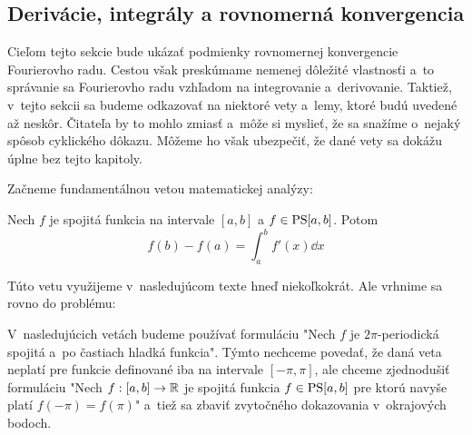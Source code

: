 \subsection{Derivácie, integrály a rovnomerná konvergencia}

Cieľom tejto sekcie bude ukázať podmienky rovnomernej konvergencie
Fourierovho radu. Cestou však preskúmame nemenej dôležité vlastnosťi
a~to správanie sa Fourierovho radu vzhľadom na integrovanie 
a~derivovanie. Taktiež, v~tejto sekcii sa budeme odkazovať na niektoré
vety a~lemy, ktoré budú uvedené až neskôr. Čitateľa by to mohlo zmiasť
a~môže si myslieť, že sa snažíme o~nejaký spôsob cyklického dôkazu.
Môžeme ho však ubezpečiť, že dané vety sa dokážu úplne bez tejto
kapitoly.

Začneme fundamentálnou vetou matematickej analýzy:
\begin{veta}
    Nech $f$ je spojitá funkcia na intervale $[a,b]$ a $f\in\mbox{PS}[a,b]$.
    Potom
    \begin{equation*}
        f(b) - f(a) = \int_a^b f'(x) \dd x
    \end{equation*}
\end{veta}
Túto vetu využijeme v~nasledujúcom texte hneď niekoľkokrát.
Ale vrhnime sa rovno do problému:

\begin{poznamka}
    V~nasledujúcich vetách budeme používať formuláciu "Nech $f$ je 
    $2\pi$-periodická spojitá a~po častiach hladká funkcia". Týmto
    nechceme povedať, že daná veta neplatí pre funkcie definované iba
    na intervale $[-\pi,\pi]$, ale chceme zjednodušiť formuláciu
    "Nech $f:[a,b]\rightarrow{\mathbb R}$ je spojitá funkcia $f\in\mbox{PS}[a,b]$
     pre ktorú navyše platí $f(-\pi)=f(\pi)$" a~tiež sa zbaviť
     zvytočného dokazovania v~okrajových bodoch.
\end{poznamka}

